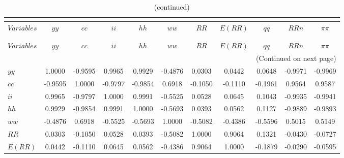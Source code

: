  
\begin{center}
\begin{longtable}{lcccccccccc} 
\caption{MATRIX OF CORRELATIONS}\\
 \label{Table:th_corr_matrix}\\
\toprule 
$Variables  $	 & 	 $         yy$	 & 	 $         cc$	 & 	 $         ii$	 & 	 $         hh$	 & 	 $         ww$	 & 	 $         RR$	 & 	 $      E(RR)$	 & 	 $         qq$	 & 	 $        RRn$	 & 	 $   \pi\pi$\\
\midrule \endfirsthead 
\caption{(continued)}\\
 \toprule \\ 
$Variables  $	 & 	 $         yy$	 & 	 $         cc$	 & 	 $         ii$	 & 	 $         hh$	 & 	 $         ww$	 & 	 $         RR$	 & 	 $      E(RR)$	 & 	 $         qq$	 & 	 $        RRn$	 & 	 $   \pi\pi$\\
\midrule \endhead 
\midrule \multicolumn{11}{r}{(Continued on next page)} \\ \bottomrule \endfoot 
\bottomrule \endlastfoot 
$yy         $	 & 	     1.0000	 & 	    -0.9595	 & 	     0.9965	 & 	     0.9929	 & 	    -0.4876	 & 	     0.0303	 & 	     0.0442	 & 	     0.0648	 & 	    -0.9971	 & 	    -0.9969 \\ 
$cc         $	 & 	    -0.9595	 & 	     1.0000	 & 	    -0.9797	 & 	    -0.9854	 & 	     0.6918	 & 	    -0.1050	 & 	    -0.1110	 & 	    -0.1961	 & 	     0.9564	 & 	     0.9587 \\ 
$ii         $	 & 	     0.9965	 & 	    -0.9797	 & 	     1.0000	 & 	     0.9991	 & 	    -0.5525	 & 	     0.0528	 & 	     0.0645	 & 	     0.1043	 & 	    -0.9935	 & 	    -0.9941 \\ 
$hh         $	 & 	     0.9929	 & 	    -0.9854	 & 	     0.9991	 & 	     1.0000	 & 	    -0.5693	 & 	     0.0393	 & 	     0.0562	 & 	     0.1127	 & 	    -0.9889	 & 	    -0.9893 \\ 
$ww         $	 & 	    -0.4876	 & 	     0.6918	 & 	    -0.5525	 & 	    -0.5693	 & 	     1.0000	 & 	    -0.5082	 & 	    -0.4386	 & 	    -0.5596	 & 	     0.5015	 & 	     0.5149 \\ 
$RR         $	 & 	     0.0303	 & 	    -0.1050	 & 	     0.0528	 & 	     0.0393	 & 	    -0.5082	 & 	     1.0000	 & 	     0.9064	 & 	     0.1321	 & 	    -0.0430	 & 	    -0.0727 \\ 
$E(RR)      $	 & 	     0.0442	 & 	    -0.1110	 & 	     0.0645	 & 	     0.0562	 & 	    -0.4386	 & 	     0.9064	 & 	     1.0000	 & 	    -0.1879	 & 	    -0.0290	 & 	    -0.0595 \\ 

\end{longtable}
\end{center}
